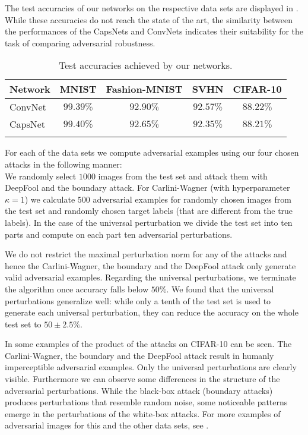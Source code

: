 The test accuracies of our networks on the respective data sets are displayed in .
While these accuracies do not reach the state of the art, the similarity between the performances of the CapsNets and ConvNets indicates their suitability for the task of comparing adversarial robustness.

\begin{table}	
	\centering
	\begin{tabular}{lcccc}
		\toprule
		Network       & MNIST & Fashion-MNIST & SVHN & CIFAR-10  \\
		\midrule
		ConvNet           & $99.39\%$ & $92.90\%$ & $92.57\%$ & $88.22\%$ \\
		CapsNet           & $99.40\%$ & $92.65\%$ & $92.35\%$ & $88.21\%$ \\
		\bottomrule\\
	\end{tabular}
	\caption{Test accuracies achieved by our networks.}
	\label{tab:accuracies}
\end{table}

For each of the data sets we compute adversarial examples using our four chosen attacks in the following manner:\\
We randomly select $1000$ images from the test set and attack them with DeepFool and the boundary attack.
For Carlini-Wagner (with hyperparameter $\kappa=1$) we calculate $500$ adversarial examples for randomly chosen images from the test set and randomly chosen target labels (that are different from the true labels). 
In the case of the universal perturbation we divide the test set into ten parts and compute on each part ten adversarial perturbations.

We do not restrict the maximal perturbation norm for any of the attacks and hence the Carlini-Wagner, the boundary and the DeepFool attack only generate valid adversarial examples.
Regarding the universal perturbations, we terminate the algorithm once accuracy falls below $50\%$.
We found that the universal perturbations generalize well: while only a tenth of the test set is used to generate each universal perturbation, they can reduce the accuracy on the whole test set to $50\pm2.5\%$.

In  some examples of the product of the attacks on CIFAR-10 can be seen.
The Carlini-Wagner, the boundary and the DeepFool attack result in humanly imperceptible adversarial examples.
Only the universal perturbations are clearly visible.
Furthermore we can observe some differences in the structure of the adversarial perturbations.
While the black-box attack (boundary attacks) produces perturbations that resemble random noise, some noticeable patterns emerge in the perturbations of the white-box attacks.
For more examples of adversarial images for this and the other data sets, see .

